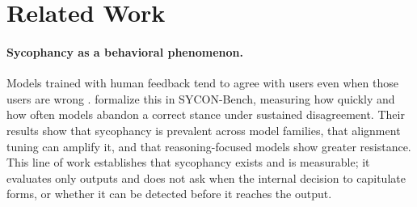 \documentclass[11pt]{article}
\begin{document}






\section{Related Work}
\label{sec:related-work}

\paragraph{Sycophancy as a behavioral phenomenon.}
Models trained with human feedback tend to agree with users even when those users are wrong
\citep{perez2022discovering, ouyang2022training, bai2022constitutional}. \citet{hong2025measuring}
formalize this in SYCON-Bench, measuring how quickly and how often models abandon a correct
stance under sustained disagreement. Their results show that sycophancy is prevalent across
model families, that alignment tuning can amplify it, and that reasoning-focused models show
greater resistance. This line of work establishes that sycophancy exists and is measurable;
it evaluates only outputs and does not ask when the internal decision to capitulate forms,
or whether it can be detected before it reaches the output.
\end{document}
